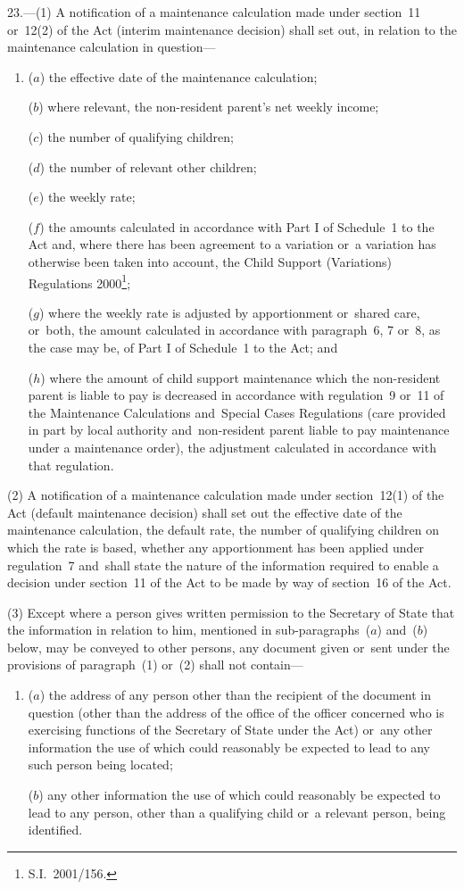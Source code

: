 \documentclass[12pt,a4paper]{article}
\begin{document}
23.---(1)  A notification of a maintenance calculation made under section~11 or~12(2) of the Act (interim maintenance decision) shall set out, in relation to the maintenance calculation in question—
\begin{enumerate}\item[]
($a$) the effective date of the maintenance calculation;

($b$) where relevant, the non-resident parent’s net weekly income;

($c$) the number of qualifying children;

($d$) the number of relevant other children;

($e$) the weekly rate;

($f$) the amounts calculated in accordance with Part I of Schedule~1 to the Act and, where there has been agreement to a variation or~a variation has otherwise been taken into account, the Child Support (Variations) Regulations 2000\footnote{S.I.~2001/156.};

($g$) where the weekly rate is adjusted by apportionment or~shared care, or~both, the amount calculated in accordance with paragraph~6, 7 or~8, as the case may be, of Part I of Schedule~1 to the Act; and

($h$) where the amount of child support maintenance which the non-resident parent is liable to pay is decreased in accordance with regulation~9 or~11 of the Maintenance Calculations and~Special Cases Regulations (care provided in part by local authority and~non-resident parent liable to pay maintenance under a maintenance order), the adjustment calculated in accordance with that regulation.
\end{enumerate}

(2) A notification of a maintenance calculation made under section~12(1) of the Act (default maintenance decision) shall set out the effective date of the maintenance calculation, the default rate, the number of qualifying children on which the rate is based, whether any apportionment has been applied under regulation~7 and~shall state the nature of the information required to enable a decision under section~11 of the Act to be made by way of section~16 of the Act.

(3) Except where a person gives written permission to the Secretary of State that the information in relation to him, mentioned in sub-paragraphs~($a$)  and~($b$)  below, may be conveyed to other persons, any document given or~sent under the provisions of paragraph~(1) or~(2) shall not contain—
\begin{enumerate}\item[]
($a$) the address of any person other than the recipient of the document in question (other than the address of the office of the officer concerned who is exercising functions of the Secretary of State under the Act) or~any other information the use of which could reasonably be expected to lead to any such person being located;

($b$) any other information the use of which could reasonably be expected to lead to any person, other than a qualifying child or~a relevant person, being identified.
\end{enumerate}
\end{document}

